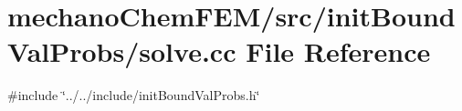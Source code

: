 \section{mechano\+Chem\+F\+E\+M/src/init\+Bound\+Val\+Probs/solve.cc File Reference}
\label{solve_8cc}
{\ttfamily \#include \char`\"{}../../include/init\+Bound\+Val\+Probs.\+h\char`\"{}}\newline
